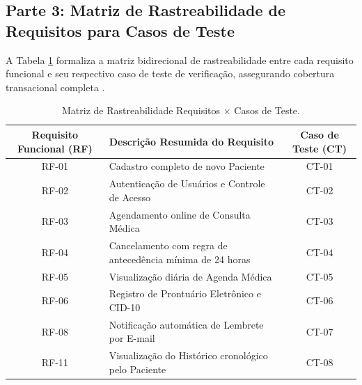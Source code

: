 \subsection{Parte 3: Matriz de Rastreabilidade de Requisitos para Casos de Teste}

A Tabela \ref{tab:matriz_testes} formaliza a matriz bidirecional de rastreabilidade entre cada requisito funcional e seu respectivo caso de teste de verificação, assegurando cobertura transacional completa \cite{beizer1995}.

\begin{table}[htbp]
\centering
\small
\caption{Matriz de Rastreabilidade Requisitos $\times$ Casos de Teste.}
\label{tab:matriz_testes}
\begin{tabularx}{\textwidth}{|c|>{\RaggedRight\arraybackslash}X|c|}
\hline
\textbf{Requisito Funcional (RF)} & \textbf{Descrição Resumida do Requisito} & \textbf{Caso de Teste (CT)} \\
\hline
RF-01 & Cadastro completo de novo Paciente & CT-01 \\
\hline
RF-02 & Autenticação de Usuários e Controle de Acesso & CT-02 \\
\hline
RF-03 & Agendamento online de Consulta Médica & CT-03 \\
\hline
RF-04 & Cancelamento com regra de antecedência mínima de 24 horas & CT-04 \\
\hline
RF-05 & Visualização diária de Agenda Médica & CT-05 \\
\hline
RF-06 & Registro de Prontuário Eletrônico e CID-10 & CT-06 \\
\hline
RF-08 & Notificação automática de Lembrete por E-mail & CT-07 \\
\hline
RF-11 & Visualização do Histórico cronológico pelo Paciente & CT-08 \\
\hline
\end{tabularx}\\
\autoria
\end{table}
